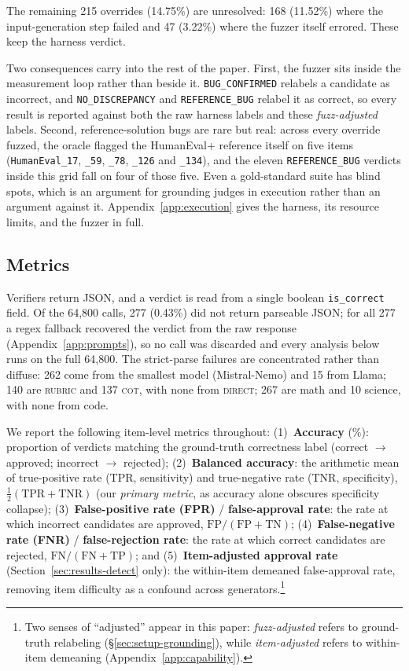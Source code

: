 The remaining 215 overrides (14.75\%) are unresolved: 168 (11.52\%) where the input-generation
step failed and 47 (3.22\%) where the fuzzer itself errored. These keep the harness verdict.

Two consequences carry into the rest of the paper. First, the fuzzer sits inside the
measurement loop rather than beside it. \texttt{BUG\_CONFIRMED} relabels a candidate as
incorrect, and \texttt{NO\_DISCREPANCY} and \texttt{REFERENCE\_BUG} relabel it as correct,
so every result is reported against both the raw harness labels and these
\emph{fuzz-adjusted} labels. Second, reference-solution bugs are rare but real: across every
override fuzzed, the oracle flagged the HumanEval+ reference itself on five items
(\texttt{HumanEval\_17}, \texttt{\_59}, \texttt{\_78}, \texttt{\_126} and
\texttt{\_134}), and the eleven \texttt{REFERENCE\_BUG} verdicts inside this grid fall on
four of those five. Even a gold-standard suite has blind spots, which is an argument for
grounding judges in execution rather than an argument against it.
Appendix~\ref{app:execution} gives the harness, its resource limits, and the fuzzer in full.

\subsection{Metrics}
\label{sec:setup-metrics}

Verifiers return JSON, and a verdict is read from a single boolean \texttt{is\_correct}
field. Of the 64{,}800 calls, 277 (0.43\%) did not return parseable JSON; for all 277 a
regex fallback recovered the verdict from the raw response
(Appendix~\ref{app:prompts}), so no call was discarded and every analysis below runs on the
full 64{,}800. The strict-parse failures are concentrated rather than diffuse: 262 come from
the smallest model (Mistral-Nemo) and 15 from Llama; 140 are \textsc{rubric} and 137
\textsc{cot}, with none from \textsc{direct}; 267 are math and 10 science, with none from
code.

We report the following item-level metrics throughout: (1)~\textbf{Accuracy} (\%): proportion of verdicts matching the ground-truth correctness label (correct $\to$ approved; incorrect $\to$ rejected); (2)~\textbf{Balanced accuracy}: the arithmetic mean of true-positive rate (TPR, sensitivity) and true-negative rate (TNR, specificity), $\tfrac{1}{2}(\mathrm{TPR}+\mathrm{TNR})$ (our \emph{primary metric}, as accuracy alone obscures specificity collapse); (3)~\textbf{False-positive rate (FPR)} / \textbf{false-approval rate}: the rate at which incorrect candidates are approved, $\mathrm{FP}/(\mathrm{FP}+\mathrm{TN})$; (4)~\textbf{False-negative rate (FNR)} / \textbf{false-rejection rate}: the rate at which correct candidates are rejected, $\mathrm{FN}/(\mathrm{FN}+\mathrm{TP})$; and (5)~\textbf{Item-adjusted approval rate} (Section~\ref{sec:results-detect} only): the within-item demeaned false-approval rate, removing item difficulty as a confound across generators.\footnote{Two senses of ``adjusted'' appear in this paper: \emph{fuzz-adjusted} refers to ground-truth relabeling (\S\ref{sec:setup-grounding}), while \emph{item-adjusted} refers to within-item demeaning (Appendix~\ref{app:capability}).}
